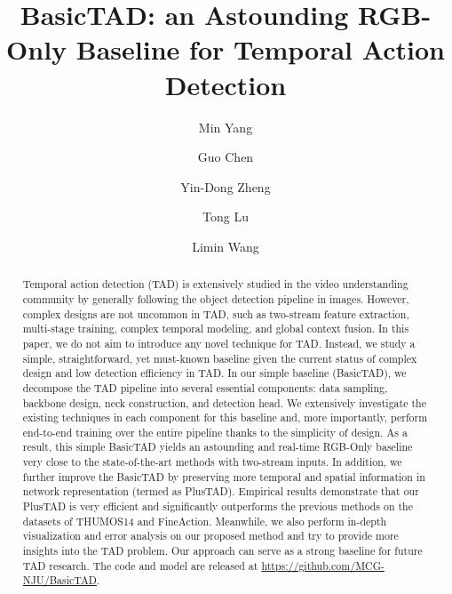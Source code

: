 \documentclass[a4paper,fleqn]{cas-dc}
\begin{document}
\let\WriteBookmarks\relax
\def\floatpagepagefraction{1}
\def\textpagefraction{.001}



\title [mode = title]{BasicTAD: an Astounding RGB-Only Baseline for Temporal Action Detection}  







\author[1]{Min Yang}\fnmark[1]

\author[1]{Guo Chen}\fnmark[1]


\author[1]{Yin-Dong Zheng}

\author[1]{Tong Lu}

\author[1]{Limin Wang }






\begin{abstract}
Temporal action detection (TAD) is extensively studied in the video understanding community by generally following the object detection pipeline in images. However, complex designs are not uncommon in TAD, such as two-stream feature extraction, multi-stage training, complex temporal modeling, and global context fusion. In this paper, we do not aim to introduce any novel technique for TAD. Instead, we study a simple, straightforward, yet must-known baseline given the current status of complex design and low detection efficiency in TAD. In our simple baseline (BasicTAD), we decompose the TAD pipeline into several essential components: data sampling, backbone design, neck construction, and detection head. We extensively investigate the existing techniques in each component for this baseline and, more importantly, perform end-to-end training over the entire pipeline thanks to the simplicity of design. As a result,  this simple BasicTAD yields an astounding and real-time RGB-Only baseline very close to the state-of-the-art methods with two-stream inputs.
In addition, we further improve the BasicTAD by preserving more temporal and spatial information in network representation (termed as PlusTAD).
Empirical results demonstrate that our PlusTAD is very efficient and significantly outperforms the previous methods on the datasets of THUMOS14 and FineAction. Meanwhile, we also perform in-depth visualization and error analysis on our proposed method and try to provide more insights into the TAD problem. Our approach can serve as a strong baseline for future TAD research. The code and model are released at \url{https://github.com/MCG-NJU/BasicTAD}.
\end{abstract}
\end{document}

